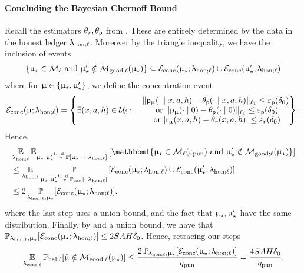 \paragraph{Concluding the Bayesian Chernoff Bound} Recall the estimators $\theta_r,\theta_{\mathsf{p}}$ from . These are entirely determined by the data in the honest ledger $\uplambda_{\mathrm{hon};\ell}$. Moreover by the triangle inequality, we have the inclusion of events
\begin{align*}
\{\upmu_{\star} \in \mathcal{M}_{\ell}  \text{ and } \upmu_{\star}' \notin \mathcal{M}_{\mathrm{good};\ell}(\upmu_{\star})\} \subseteq \mathcal{E}_{\mathrm{conc}}(\upmu_{\star};\uplambda_{\mathrm{hon};\ell}) \cup  \mathcal{E}_{\mathrm{conc}}(\upmu_{\star}';\uplambda_{\mathrm{hon};\ell})
\end{align*}
where for $\upmu \in \{\upmu_{\star},\upmu_{\star}'\}$, we define the concentration event
\begin{align*}
\mathcal{E}_{\mathrm{conc}}(\upmu;\uplambda_{\mathrm{hon};\ell}) = \left\{\exists (x,a,h) \in \mathcal{U}_{\ell} : \begin{matrix}  &\|\mathsf{p}_{\upmu}(\cdot \mid x,a,h) - \theta_{\mathsf{p}}(\cdot \mid x,a,h) \|_{\ell_1} \le \varepsilon_{\mathsf{p}}(\delta_0) \\
&\text{ or }\|\mathsf{p}_{\upmu}(\cdot \mid 0) - \theta_{\mathsf{p}}(\cdot \mid 0) \|_{\ell_1} \le \varepsilon_{\mathsf{p}}(\delta_0)\\
&\text{ or }  |\mathsf{r}_{\upmu}(x,a,h) - \theta_r(x,a,h)| \le  \varepsilon_{r}(\delta_0)
\end{matrix} \right\}.
\end{align*}
Hence,
\begin{align*}
&\Expop_{\ledhonl}\Exp_{\modst, \modst' \iidsim  \Pr[\modst = \cdot \mid \ledhonl] } \left[\ind\{\modst \in \modclass_{\ell}(\epspunish) \text{ and } \modst' \notin \modgoodl(\modst) \}\right]\\
&\le \Expop_{ \ledhonl}\Prop_{\modst,\modst' \iidsim \Prcan[\cdot \mid \ledhonl]}\left[\calE_{\mathrm{conc}}(\modst;\ledhonl) \cup  \calE_{\mathrm{conc}}(\modst';\ledhonl) \right]\\
 &\le 2\Prop_{ \ledhonl,\modst}[\calE_{\mathrm{conc}}(\modst;\ledhonl) ].
\end{align*}
where the last step uses a union bound, and the fact that $\upmu_{\star},\upmu_{\star}'$ have the same distribution. Finally, by  and a union bound, we have that $\Prop_{ \ledhonl,\modst}[\calE_{\mathrm{conc}}(\modst;\ledhonl) ] \le 2SAH \delta_0$. Hence, retracing our steps
\begin{align}
\Expop_{\ledcensl}\Prhall[\modvarhat \notin \modgoodl(\modst)]  \le \frac{2\Prop_{ \ledhonl,\modst}[\calE_{\mathrm{conc}}(\modst;\ledhonl) ]}{\qpunish}=  \frac{4SAH \delta_0}{\qpunish}. \label{eq:delta_not_fin}
\end{align}
